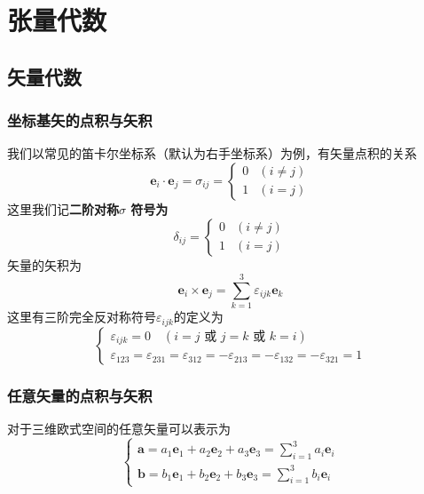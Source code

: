 \section{张量代数}
	\subsection{矢量代数}
		\subsubsection*{坐标基矢的点积与矢积\label{sec.app_1_1_1}}
			我们以常见的笛卡尔坐标系（默认为右手坐标系）为例，有矢量点积的关系
			\begin{equation}
				\boldsymbol{e}_{i} \cdot \boldsymbol{e}_{j}=\sigma_{ij}= \begin{cases}0 & (i \neq j) \\ 1 & (i=j)\end{cases}
			\end{equation}
			这里我们记\textbf{二阶对称$\sigma$ 符号为}
				\begin{equation}
					\delta_{i j}= \begin{cases}0 & (i \neq j) \\ 1 & (i=j)\end{cases}
				\end{equation}
			矢量的矢积为
				\begin{equation}
					\boldsymbol{e}_{i} \times \boldsymbol{e}_{j}=\sum_{k=1}^{3} \varepsilon_{i j k} \boldsymbol{e}_{k}
				\end{equation}
			这里有三阶完全反对称符号$\varepsilon_{ijk}$的定义为
			\begin{equation}
				\left\{\begin{array}{l}
				\varepsilon_{i j k}=0 \quad(i=j \text { 或 } j=k \text { 或 } k=i) \\
				\varepsilon_{123}=\varepsilon_{231}=\varepsilon_{312}=-\varepsilon_{213}=-\varepsilon_{132}=-\varepsilon_{321}=1
				\end{array}\right.
			\end{equation}
		\subsubsection*{任意矢量的点积与矢积}
			对于三维欧式空间的任意矢量可以表示为
				\begin{equation}
					\left\{\begin{array}{l}
					\boldsymbol{a}=a_{1} \boldsymbol{e}_{1}+a_{2} \boldsymbol{e}_{2}+a_{3} \boldsymbol{e}_{3}=\sum_{i=1}^{3} a_{i} \boldsymbol{e}_{i} \\
					\boldsymbol{b}=b_{1} \boldsymbol{e}_{1}+b_{2} \boldsymbol{e}_{2}+b_{3} \boldsymbol{e}_{3}=\sum_{i=1}^{3} b_{i} \boldsymbol{e}_{i}
					\end{array}\right.
				\end{equation}
			
